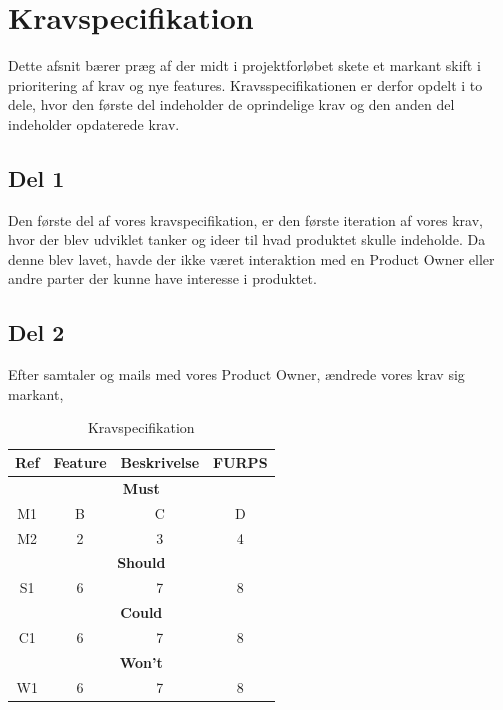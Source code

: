 \section{Kravspecifikation}

Dette afsnit bærer præg af der midt i projektforløbet skete et markant skift i prioritering af krav og nye features.
Kravsspecifikationen er derfor opdelt i to dele, hvor den første del indeholder de oprindelige krav og den anden del indeholder opdaterede krav.

\subsection{Del 1}

Den første del af vores kravspecifikation, er den første iteration af vores krav, hvor der blev udviklet tanker og ideer
til hvad produktet skulle indeholde.
Da denne blev lavet, havde der ikke været interaktion med en Product Owner eller andre parter der kunne have interesse i
produktet.

\subsection{Del 2}

Efter samtaler og mails med vores Product Owner, ændrede vores krav sig markant,


\begin{table}[h]
\centering
\begin{tabular}{|c|c|c|c|}

\hline
Ref & Feature & Beskrivelse & FURPS \\
\hline


\multicolumn{4}{|c|}{\textbf{Must}} \\
\hline
M1 & B & C & D \\
\hline
M2 & 2 & 3 & 4 \\
\hline

\multicolumn{4}{|c|}{\textbf{Should}} \\
\hline
S1 & 6 & 7 & 8 \\
\hline

\multicolumn{4}{|c|}{\textbf{Could}} \\
\hline
C1 & 6 & 7 & 8 \\
\hline

\multicolumn{4}{|c|}{\textbf{Won't}} \\
\hline
W1 & 6 & 7 & 8 \\
\hline

\end{tabular}
\caption{Kravspecifikation}
\end{table}